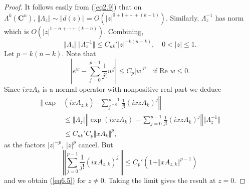 \documentclass{surv-l}
\theoremstyle{plain}
\theoremstyle{definition}
\numberwithin{equation}{chapter}
\begin{document}
\begin{proof}
It follows easily from (\ref{eq2.9}) that on $\Lambda^{k}(\mathbf{C}^{n}),\, \Vert\Lambda_{z}\Vert\sim\Vert d(z)\Vert= O(|z|^{0+1+\cdots +(k-1)})$. Similarly, $\Lambda_{z}^{-1}$ has norm which is $O(|z|^{1-n+\cdots +(k-n)})$. Combining,
\begin{equation}\label{eq6.6}
\Vert\Lambda_{z}\Vert\,\Vert\Lambda_{z}^{-1}\Vert\leq C_{nk}'|z|^{-k(n-k)},\quad 0<|z|\leq 1.
\end{equation}
Let $p=k(n -k)$. Note that
\begin{equation*}
\left|e^{w}-\sum_{j=0}^{p-1}\frac{1}{j!}w^{j}\right|\leq C_{p}|w|^{p}\quad \text{if Re } w\leq 0.
\end{equation*}
Since $ixzA_{k}$ is a normal operator with nonpositive real part we deduce
\begin{align*}
\Bigg\Vert \exp &(ixA_{z,k})\left. -\sum_{j^{=0}}^{p-1}\frac{1}{j!}(ixzA_{k})^{j}\right\Vert\\
&\leq\Vert\Lambda_{z}\Vert\left\Vert\exp(ixzA_{k})-\sum_{j=0}^{p-1}\frac{1}{j!}(ixzA_{k})^{j}\right\Vert\Vert\Lambda_{z}^{-1}\Vert\\
&\leq C_{nk}'C_{p}\Vert xA_{k}\Vert^{p},
\end{align*}
as the factors $|z|^{-p},\ |z|^{p}$ cancel. But
\begin{equation*}
\left\Vert\sum_{j=0}^{p-1}\frac{1}{j!}(ixA_{z,k})^{j}\ \right\Vert\leq C_{p}'(1+\Vert xA_{z,k}\Vert^{p-1})
\end{equation*}
and we obtain (\ref{eq6.5}) for $z\neq 0$. Taking the limit gives the result at $z=0$.
\end{proof}
\setcounter{theorem}{6}
\end{document}
